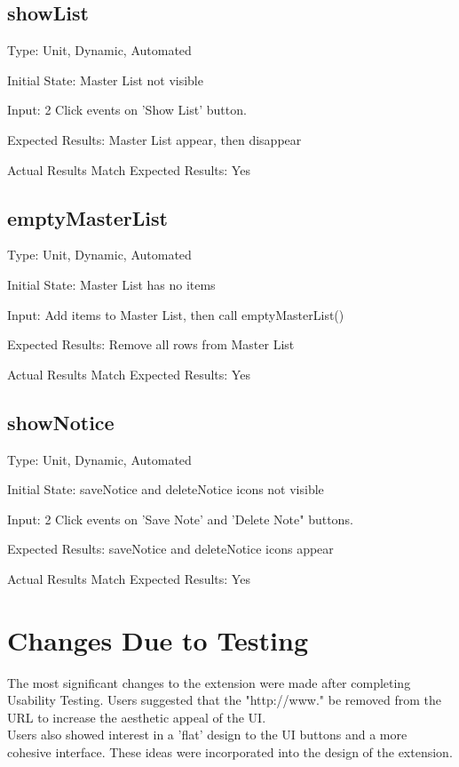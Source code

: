 \documentclass[12pt, titlepage]{article}
\begin{document}
\subsection{showList}

	Type: Unit, Dynamic, Automated

	Initial State: Master List not visible

	Input: 2 Click events on 'Show List' button.

	Expected Results: Master List appear, then disappear

	Actual Results Match Expected Results: Yes

\subsection{emptyMasterList}

	Type: Unit, Dynamic, Automated

	Initial State: Master List has no items

	Input: Add items to Master List, then call emptyMasterList()

	Expected Results: Remove all rows from Master List 

	Actual Results Match Expected Results: Yes

\subsection{showNotice}

	Type: Unit, Dynamic, Automated

	Initial State: saveNotice and deleteNotice icons not visible

	Input: 2 Click events on 'Save Note' and 'Delete Note" buttons.

	Expected Results: saveNotice and deleteNotice icons appear

	Actual Results Match Expected Results: Yes

\section{Changes Due to Testing}
		
	The most significant changes to the extension were made after completing 
	Usability Testing. Users suggested that the "http://www." be removed from 
	the URL to increase the aesthetic appeal of the UI.\\
	Users also showed interest in a 'flat' design to the UI buttons and a more 
	cohesive interface. These ideas were incorporated into the design of the 
	extension.
		
\end{document}
